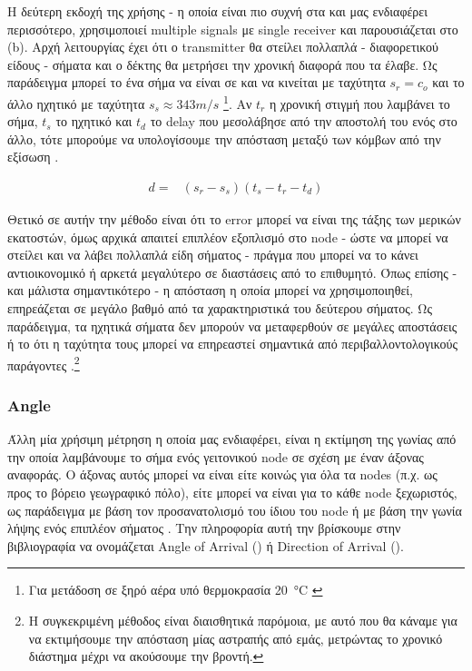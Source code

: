 Η δεύτερη εκδοχή της χρήσης  - η οποία είναι πιο συχνή στα  και 
μας ε\-νδια\-φέ\-ρει περισσότερο, 
χρησιμοποιεί multiple signals με single receiver και παρουσιάζεται στο  (b). 
Αρχή λειτουργίας έχει ότι ο transmitter θα στείλει πολλαπλά - διαφορετικού είδους - σήματα και ο δέκτης θα μετρήσει την χρονική διαφορά 
που τα έλαβε. Ως παράδειγμα μπορεί το ένα σήμα να είναι σε  και να κινείται με ταχύτητα $s_r=c_o$ και το άλλο 
ηχητικό με ταχύτητα $s_s \approx 343m/s$ \footnote{Για μετάδοση σε ξηρό αέρα υπό θερμοκρασία \SI{20}{\celsius} \cite{wikipedia-speed-of-sound}}. 
Αν $t_r$ η χρονική στιγμή που λαμβάνει το  σήμα, $t_s$ το ηχητικό και $t_d$ το delay που μεσολάβησε από την αποστολή του ενός στο άλλο,
τότε μπορούμε να υπολογίσουμε την απόσταση μεταξύ των κόμβων από την εξίσωση 
\cite{wsn-Localization-systems} \cite{localization-algorithms}.

\begin{align}
	d=&(s_r-s_s)(t_s-t_r-t_{d}) \label{eq:tdoa-distance}
\end{align}

Θετικό σε αυτήν την μέθοδο είναι ότι το error μπορεί να είναι της τάξης των μερικών εκατοστών, όμως αρχικά απαιτεί επιπλέον εξοπλισμό στο node -
ώστε να μπορεί να στείλει και να λάβει πολλαπλά είδη σήματος - πράγμα που μπορεί να το κάνει αντι\-οι\-κο\-νο\-μι\-κό ή αρκετά μεγαλύτερο σε διαστάσεις από 
το επιθυμητό. Όπως επίσης - και μάλιστα  
σημαντικότερο - η απόσταση η οποία μπορεί να 
χρησιμοποιηθεί, επηρεάζεται σε μεγάλο βαθμό από τα χαρακτηριστικά του δεύτερου σήματος. Ως παράδειγμα, τα ηχητικά σήματα 
δεν μπορούν να μεταφερθούν σε μεγάλες αποστάσεις ή το ότι η ταχύτητα τους μπορεί να επηρεαστεί σημαντικά από περιβαλλοντολογικούς παράγοντες
\cite{farooqiazam2016location}.\footnote{Η συγκεκριμένη μέθοδος είναι διαισθητικά παρόμοια, με αυτό που θα κάναμε για να εκτιμήσουμε 
την απόσταση μίας αστραπής από εμάς, μετρώντας το χρονικό διάστημα μέχρι να ακούσουμε την βροντή.} 

\subsubsection{Angle}\label{sec:Chapter3-1-2}

Άλλη μία χρήσιμη μέτρηση η οποία μας ενδιαφέρει, είναι η εκτίμηση της γωνίας από την οποία λαμβάνουμε το σήμα ενός γειτονικού
node σε σχέση με έναν άξονας αναφοράς. Ο άξονας αυτός μπορεί να είναι είτε κοινώς για όλα τα nodes (π.χ. ως προς το βόρειο γεωγραφικό πόλο),
είτε μπορεί να είναι για το κάθε node ξεχωριστός, ως παράδειγμα με βάση τον προσανατολισμό του ίδιου του node ή με βάση την γωνία λήψης ενός 
επιπλέον σήματος \cite{wsn-Localization-systems}. Την πληροφορία αυτή την βρίσκουμε στην βιβλιογραφία να ονομάζεται Angle of Arrival 
() ή Direction of Arrival (). 

